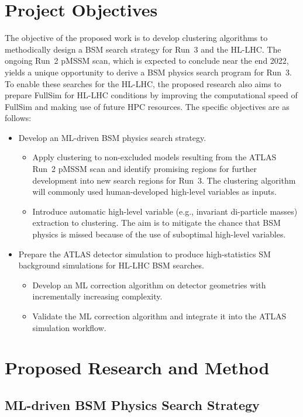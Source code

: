 \documentclass[letter, USenglish, 11pt, subfigure]{article}
\begin{document}
\section{Project Objectives}
The objective of the proposed work is to develop clustering algorithms to methodically design a BSM search strategy for Run~3 and the HL-LHC. The ongoing Run~2 pMSSM scan, which is expected to conclude near the end 2022, yields a unique opportunity to derive a BSM physics search program for Run~3. To enable these searches for the HL-LHC, the proposed research also aims to prepare FullSim for HL-LHC conditions by improving the computational speed of FullSim and making use of future HPC resources. The specific objectives are as follows:
\begin{itemize}
\item Develop an ML-driven BSM physics search strategy.
  \begin{itemize}
  \item Apply clustering to non-excluded models resulting from the ATLAS Run~2 pMSSM scan and identify promising regions for further development into new search regions for Run~3. The clustering algorithm will commonly used human-developed high-level variables as inputs. 
  \item Introduce automatic high-level variable (e.g., invariant di-particle masses) extraction to clustering. The aim is to mitigate the chance that BSM physics is missed because of the use of suboptimal high-level variables. %
  \end{itemize}
\item Prepare the ATLAS detector simulation to produce high-statistics SM background simulations for HL-LHC BSM searches.
  \begin{itemize}
  \item Develop an ML correction algorithm on detector geometries with incrementally increasing complexity.
  \item Validate the ML correction algorithm and integrate it into the ATLAS simulation workflow.
  \end{itemize}
\end{itemize}

\section{Proposed Research and Method}

\subsection{ML-driven BSM Physics Search Strategy}
\end{document}
